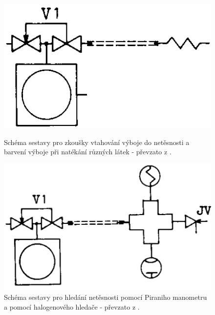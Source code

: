 \documentclass[english]{article}
\begin{document}
\begin{figure}[h!]
\centering
\begin{minipage}[t]{.40\textwidth}
\centering
				\includegraphics[scale=0.33]{../att/schema_vtahovani}
				\caption{Schéma sestavy pro zkoušky vtahování výboje do netěsnosti a barvení výboje při natékání různých látek - převzato z \cite{bib:praskripta}.}
				\label{fig:s_1}
\end{minipage}%
\hfill
\begin{minipage}[t]{.50\textwidth}
\centering
				\includegraphics[scale=0.31]{../att/schema_tepelny}
				\caption{Schéma sestavy pro hledání netěsnosti pomocí Piraniho manometru a pomocí halogenového hledače - převzato z \cite{bib:praskripta}.}
				\label{fig:s_2}
\end{minipage}
\end{figure}
			
\end{document}

